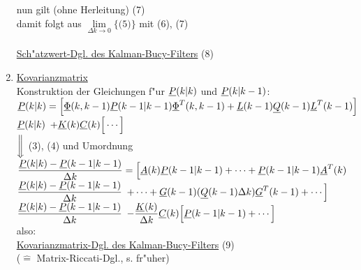 \documentclass[openany,a4paper,11pt]{book}
\begin{document}
\begin{enumerate}
    nun gilt (ohne Herleitung)  \quad (7)\\[3pt]
    damit folgt aus $\displaystyle\mathop{\text{lim}}\limits_{\Delta k\rightarrow0}\Big\{\text{(5)}\Big\}$ mit (6), (7)\\
     \\[2pt]
    \uline{Sch"atzwert-Dgl. des Kalman-Bucy-Filters} \quad (8)
    \item \uline{Kovarianzmatrix}\\
    Konstruktion der Gleichungen f"ur $\uline{P}(k|k)$ und $\uline{P}(k|k-1)$:\\
    $\uline{P}(k|k)=\Big[\uline{\Phi}(k,k-1)\uline{P}(k-1|k-1)\uline{\Phi}^T(k,k-1)+\uline{L}(k-1)\uline{Q}(k-1)\uline{L}^T(k-1)\Big]$\\
    {\color{white} $\uline{P}(k|k)$} $+\uline{K}(k)\uline{C}(k)\Big[\cdots\Big]$\\
    \qquad \qquad$\bigg\Downarrow$ (3), (4) und Umordnung\\
    $\displaystyle\frac{\uline{P}(k|k)-\uline{P}(k-1|k-1)}{\Delta k}=\Big[\uline{A}(k)\uline{P}(k-1|k-1)+\cdots+\uline{P}(k-1|k-1)\uline{A}^T(k)$\\
    {\color{white} $\displaystyle\frac{\uline{P}(k|k)-\uline{P}(k-1|k-1)}{\Delta k}$} $+\cdots+\uline{G}(k-1)(\uline{Q}(k-1)\Delta k)\uline{G}^T(k-1)+\cdots\Big]$\\
    {\color{white} $\displaystyle\frac{\uline{P}(k|k)-\uline{P}(k-1|k-1)}{\Delta k}$} $\displaystyle-\frac{\uline{K}(k)}{\Delta k}\uline{C}(k)\Big[\uline{P}(k-1|k-1)+\cdots\Big]$\\
    also: \\[2pt]
    \uline{Kovarianzmatrix-Dgl. des Kalman-Bucy-Filters} \quad (9)\\
    ($\hat{=}$ Matrix-Riccati-Dgl., s. fr"uher)
\end{enumerate}
\end{document}
